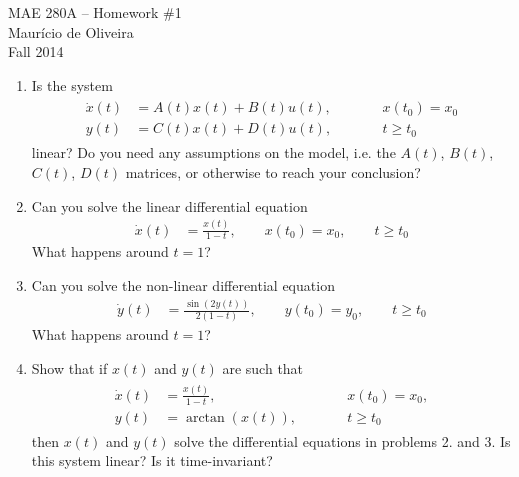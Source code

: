 \documentclass[11pt]{article}
\begin{document}
\pagestyle{empty}

\begin{center}
  {\Large MAE 280A -- Homework \#1} \\[1em]
  {\large Maur\'icio de Oliveira} \\[1ex]
  Fall 2014
\end{center}

\begin{enumerate}[1.]

\item Is the system
  \begin{align}
    \label{eq:ss}
    \begin{aligned}
      \dot{x}(t) &= A(t) x(t) + B(t) u(t), && \qquad x(t_0) = x_0 \\
      y(t) &= C(t) x(t) + D(t) u(t), && \qquad t \geq t_0
    \end{aligned}
  \end{align}
  linear? Do you need any assumptions on the model, i.e. the $A(t)$,
  $B(t)$, $C(t)$, $D(t)$ matrices, or otherwise to reach your
  conclusion?

\item Can you solve the linear differential equation
  \begin{align*}
    \dot{x}(t) &= \frac{x(t)}{1 - t}, \qquad x(t_0) = x_0, \qquad
    t \geq t_0
  \end{align*}
  What happens around $t = 1$?

\item Can you solve the non-linear differential equation
  \begin{align*}
    \dot{y}(t) &= \frac{\sin(2 y(t))}{2(1 - t)}, \qquad y(t_0) = y_0, \qquad 
    t \geq t_0
  \end{align*}
  What happens around $t = 1$?

\item Show that if $x(t)$ and $y(t)$ are such that
  \begin{align*}
    \begin{aligned}
      \dot{x}(t) &= \frac{x(t)}{1 - t}, && \qquad x(t_0) = x_0, \\
      y(t) &= \arctan(x(t)), && \qquad t \geq t_0
    \end{aligned}
  \end{align*}
  then $x(t)$ and $y(t)$ solve the differential equations in problems
  2. and 3. Is this system linear? Is it time-invariant?


\end{enumerate}
\end{document}

